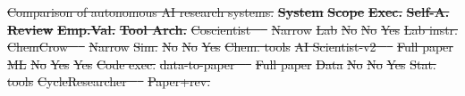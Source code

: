 \documentclass{article}
\providecommand{\DIFdeltex}[1]{{\protect\color{red}\sout{#1}}}                      %
\providecommand{\DIFdelFL}[1]{\DIFdel{#1}} %
\providecommand{\DIFdel}[1]{\texorpdfstring{\DIFdeltex{#1}}{}} %
\begin{document}
{%
\DIFdelFL{Comparison of autonomous AI research systems.}}
\textbf{\DIFdelFL{System}} %
\textbf{\DIFdelFL{Scope}} %
\textbf{\DIFdelFL{Exec.}} %
\textbf{\DIFdelFL{Self-A.}} %
\textbf{\DIFdelFL{Review}} %
\textbf{\DIFdelFL{Emp.Val.}} %
\textbf{\DIFdelFL{Tool Arch.}} %
\DIFdelFL{Coscientist \mbox{%
\citep{boiko2023autonomous} }\hskip0pt%
}%
\DIFdelFL{Narrow }%
\DIFdelFL{Lab }%
\DIFdelFL{No }%
\DIFdelFL{No }%
\DIFdelFL{Yes }%
\DIFdelFL{Lab instr. }%
\DIFdelFL{ChemCrow \mbox{%
\citep{bran2024chemistry} }\hskip0pt%
}%
\DIFdelFL{Narrow }%
\DIFdelFL{Sim. }%
\DIFdelFL{No }%
\DIFdelFL{No }%
\DIFdelFL{Yes }%
\DIFdelFL{Chem. tools }%
\DIFdelFL{AI Scientist-v2 \mbox{%
\citep{yamada2025scientist} }\hskip0pt%
}%
\DIFdelFL{Full paper }%
\DIFdelFL{ML }%
\DIFdelFL{No }%
\DIFdelFL{Yes }%
\DIFdelFL{Yes }%
\DIFdelFL{Code exec. }%
\DIFdelFL{data-to-paper \mbox{%
\citep{ifargan2024autonomous} }\hskip0pt%
}%
\DIFdelFL{Full paper }%
\DIFdelFL{Data }%
\DIFdelFL{No }%
\DIFdelFL{No }%
\DIFdelFL{Yes }%
\DIFdelFL{Stat. tools }%
\DIFdelFL{CycleResearcher \mbox{%
\citep{weng2024cycleresearcher} }\hskip0pt%
}%
\DIFdelFL{Paper+rev. }%
\end{document}
